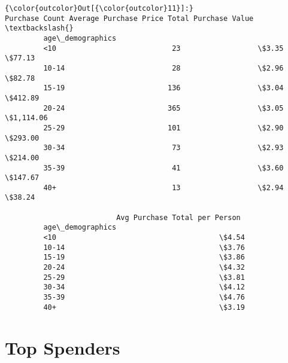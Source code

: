 \documentclass[11pt]{article}
\begin{document}
\begin{Verbatim}[commandchars=\\\{\}]
{\color{outcolor}Out[{\color{outcolor}11}]:}                   Purchase Count Average Purchase Price Total Purchase Value  \textbackslash{}
         age\_demographics                                                               
         <10                           23                  \$3.35               \$77.13   
         10-14                         28                  \$2.96               \$82.78   
         15-19                        136                  \$3.04              \$412.89   
         20-24                        365                  \$3.05            \$1,114.06   
         25-29                        101                  \$2.90              \$293.00   
         30-34                         73                  \$2.93              \$214.00   
         35-39                         41                  \$3.60              \$147.67   
         40+                           13                  \$2.94               \$38.24   
         
                          Avg Purchase Total per Person  
         age\_demographics                                
         <10                                      \$4.54  
         10-14                                    \$3.76  
         15-19                                    \$3.86  
         20-24                                    \$4.32  
         25-29                                    \$3.81  
         30-34                                    \$4.12  
         35-39                                    \$4.76  
         40+                                      \$3.19  
\end{Verbatim}
            
    \section{Top Spenders}\label{top-spenders}
\end{document}
